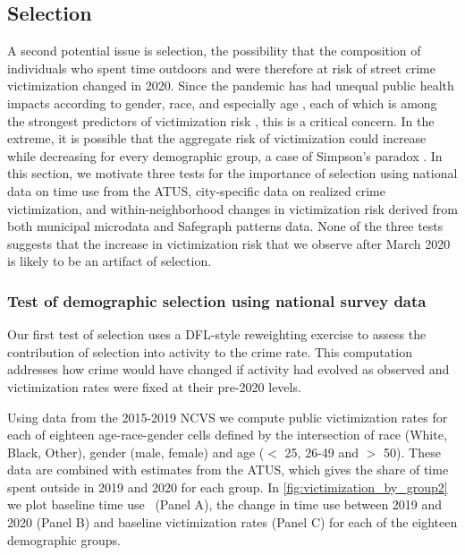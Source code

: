 \subsection{Selection} \label{sec:selection}
A second potential issue is selection, the possibility that the composition of individuals who spent time outdoors and were therefore at risk of street crime victimization changed in 2020. Since the pandemic has had unequal public health impacts according to gender, race, and especially age \citep[e.g.][]{hutchins2020covid, miller2021estimated}, each of which is among the strongest predictors of victimization risk \citep[e.g.][]{perkins1997age}, this is a critical concern. In the extreme, it is possible that the aggregate risk of victimization could increase while decreasing for every demographic group, a case of Simpson's paradox \citep{blyth1972simpson}. In this section, we motivate three tests for the importance of selection using national data on time use from the ATUS, city-specific data on realized crime victimization, and within-neighborhood changes in victimization risk derived from both municipal microdata and Safegraph patterns data. None of the three tests suggests that the increase in victimization risk that we observe after March 2020 is likely to be an artifact of selection.

\subsubsection{Test of demographic selection using national survey data} \label{sec:demog_selection}
Our first test of selection uses a DFL-style reweighting exercise \citep{dinardo1996labor} to assess the contribution of selection into activity to the crime rate. This computation addresses how crime would have changed if activity had evolved as observed and victimization rates were fixed at their pre-2020 levels. 

Using data from the 2015-2019 NCVS we compute public victimization rates for each of eighteen age-race-gender cells defined by the intersection of race (White, Black, Other), gender (male, female) and age ($<$ 25, 26-49 and $>$ 50).%
These data are combined with estimates from the ATUS, which gives the share of time spent outside in 2019 and 2020 for each group. In \autoref{fig:victimization_by_group2} we plot baseline time use  (Panel A), the change in time use between 2019 and 2020 (Panel B) and baseline victimization rates (Panel C) for each of the eighteen demographic groups. 

